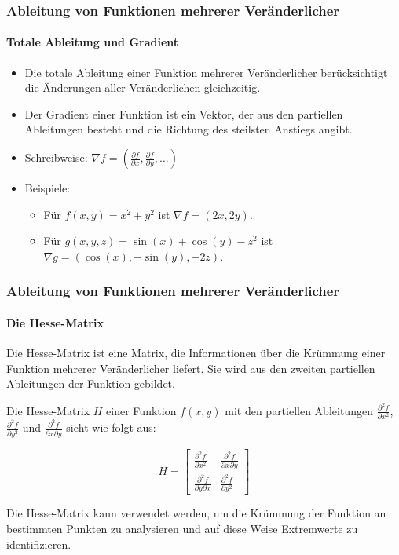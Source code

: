 \documentclass{beamer}
\begin{document}
\begin{frame}
  \frametitle{Ableitung von Funktionen mehrerer Veränderlicher}
  \framesubtitle{Totale Ableitung und Gradient}

  \begin{itemize}
    \item Die totale Ableitung einer Funktion mehrerer Veränderlicher berücksichtigt die Änderungen aller Veränderlichen gleichzeitig.
    \item Der Gradient einer Funktion ist ein Vektor, der aus den partiellen Ableitungen besteht und die Richtung des steilsten Anstiegs angibt.
    \item Schreibweise: $\nabla f = \left(\frac{\partial f}{\partial x}, \frac{\partial f}{\partial y}, \ldots\right)$
    \item Beispiele:
      \begin{itemize}
        \item Für $f(x, y) = x^2 + y^2$ ist $\nabla f = (2x, 2y)$.
        \item Für $g(x, y, z) = \sin(x) + \cos(y) - z^2$ ist $\nabla g = (\cos(x), -\sin(y), -2z)$.
      \end{itemize}
  \end{itemize}
\end{frame}

\begin{frame}
    \frametitle{Ableitung von Funktionen mehrerer Veränderlicher}
    \framesubtitle{Die Hesse-Matrix}
  
    Die Hesse-Matrix ist eine Matrix, die Informationen über die Krümmung einer Funktion mehrerer Veränderlicher liefert. Sie wird aus den zweiten partiellen Ableitungen der Funktion gebildet.
  
    \vspace{1em}
  
    Die Hesse-Matrix $H$ einer Funktion $f(x, y)$ mit den partiellen Ableitungen $\frac{\partial^2 f}{\partial x^2}$, $\frac{\partial^2 f}{\partial y^2}$ und $\frac{\partial^2 f}{\partial x \partial y}$ sieht wie folgt aus:
  
    \[
    H =
    \begin{bmatrix}
      \frac{\partial^2 f}{\partial x^2} & \frac{\partial^2 f}{\partial x \partial y} \\
      \frac{\partial^2 f}{\partial y \partial x} & \frac{\partial^2 f}{\partial y^2}
    \end{bmatrix}
    \]
  
    \vspace{1em}
  
    Die Hesse-Matrix kann verwendet werden, um die Krümmung der Funktion an bestimmten Punkten zu analysieren und auf diese Weise Extremwerte zu identifizieren.
\end{frame}
\end{document}
